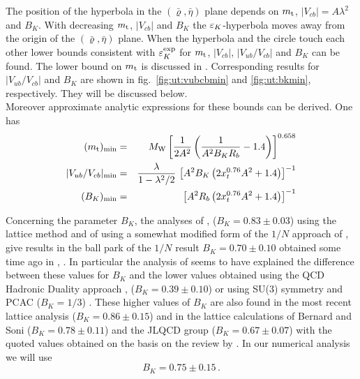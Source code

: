 The position of the hyperbola  in the
$(\bar\varrho,\bar\eta)$ plane depends on $m_{\rm t}$, $|V_{cb}|=A \lambda^2$
and $B_K$. With decreasing $m_{\rm t}$, $|V_{cb}|$ and $B_K$ the
$\varepsilon_K$-hyperbola moves away from the origin of the
$(\bar\varrho,\bar\eta)$ plane. When the hyperbola and the circle
 touch each other lower bounds consistent with $\varepsilon_K^{\rm
exp}$ for $m_{\rm t}$, $|V_{cb}|$, $|V_{ub}/V_{cb}|$ and $B_K$ can be found.
The lower bound on $m_{\rm t}$ is discussed in \cite{buras:93}.
Corresponding results for $|V_{ub}/V_{cb}|$ and $B_K$ are shown in
fig.\ \ref{fig:ut:vubcbmin} and \ref{fig:ut:bkmin}, respectively.
They will be discussed below.
\\
Moreover approximate analytic expressions for these bounds can be
derived. One has
\begin{eqnarray}
(m_{\rm t})_{\rm min} &=& M_{\rm W} \left[ \frac{1}{2 A^2} \left( \frac{1}{A^2 B_K
R_b} - 1.4 \right) \right]^{0.658}
\label{eq:mtmin} \\
|V_{ub}/V_{cb}|_{\rm min} &=&
\frac{\lambda}{1-\lambda^2/2} \,
\left[ A^2 B_K \left( 2 x_t^{0.76} A^2 + 1.4 \right) \right]^{-1}
\label{eq:Vubcbmin} \\
(B_K)_{\rm min} &=& \left[ A^2 R_b \left( 2 x_t^{0.76} A^2 + 1.4 \right)
                    \right]^{-1}
\label{eq:BKmin}
\end{eqnarray}

Concerning the parameter $B_K$, the analyses of \cite{sharpe:94},
\cite{ishizuka:93} ($B_K=0.83\pm 0.03$) using the lattice method and of
\cite{bijnenspardes:95} using a somewhat modified form of the $1/N$
approach of \cite{bardeenetal:88}, \cite{gerard:90} give results in the
ball park of the $1/N$ result $B_K=0.70\pm 0.10$ obtained some time ago
in \cite{bardeenetal:88}, \cite{gerard:90}. In particular the analysis
of \cite{bijnenspardes:95} seems to have explained the difference
between these values for $B_K$ and the lower values obtained using the
QCD Hadronic Duality approach \cite{pichderaf:85}, \cite{pradesetal:91}
($B_K=0.39\pm 0.10$) or using SU(3) symmetry and PCAC ($B_K=1/3$)
\cite{donoghueetal:82}. These higher values of $B_K$ are also found in
the most recent lattice analysis \cite{crisafullietal:95}
($B_K=0.86 \pm 0.15$) and in the lattice calculations of Bernard and
Soni ($B_K=0.78 \pm 0.11$) and the JLQCD group ($B_K=0.67 \pm 0.07$)
with the quoted values obtained on the basis on the review by
\cite{soni:95}. In our numerical analysis we will use
\begin{equation}
B_K = 0.75 \pm 0.15 \, .
\label{eq:BKnum}
\end{equation}

